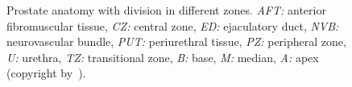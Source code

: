 \begin{figure}
	\centering
	\hspace*{\fill}
			\hfill
	\hspace*{\fill}
	\caption[Prostate anatomy.]{Prostate anatomy with division in different zones. \textit{AFT:} anterior fibromuscular tissue, \textit{CZ:} central zone, \textit{ED:} ejaculatory duct, \textit{NVB:} neurovascular bundle, \textit{PUT:} periurethral tissue, \textit{PZ:} peripheral zone, \textit{U:} urethra, \textit{TZ:} transitional zone, \textit{B:} base, \textit{M:} median, \textit{A:} apex (copyright by~\cite{Choi2007}).}
	\label{fig:anatomyProstateZone}
\end{figure}

